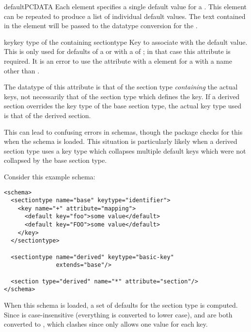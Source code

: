 \documentclass{howto}
\newcommand{\datatype}[1]{\strong{#1}}
\begin{document}
\begin{elementdesc}{default}{PCDATA}
  Each  element specifies a single default value for
  a .  This element can be repeated to produce a
  list of individual default values.  The text contained in the
  element will be passed to the datatype conversion for the
  .

  \begin{attributedesc}{key}{key type of the containing sectiontype}
    Key to associate with the default value.  This is only used for
    defaults of a  or  with a
     of \code{+}; in that case this attribute is
    required.  It is an error to use the  attribute
    with a  element for a  with a
    name other than \code{+}.

    \begin{notice}[warning]
      The datatype of this attribute is that of the section type
      \emph{containing} the actual keys, not necessarily that of the
      section type which defines the key.  If a derived section
      overrides the key type of the base section type, the actual
      key type used is that of the derived section.

      This can lead to confusing errors in schemas, though the
       package checks for this when the schema is
      loaded.  This situation is particularly likely when a derived
      section type uses a key type which collapses multiple default
      keys which were not collapsed by the base section type.

      Consider this example schema:

\begin{verbatim}
<schema>
  <sectiontype name="base" keytype="identifier">
    <key name="+" attribute="mapping">
      <default key="foo">some value</default>
      <default key="FOO">some value</default>
    </key>
  </sectiontype>

  <sectiontype name="derived" keytype="basic-key"
               extends="base"/>

  <section type="derived" name="*" attribute="section"/>
</schema>
\end{verbatim}

      When this schema is loaded, a set of defaults for the
      \datatype{derived} section type is computed.  Since
      \datatype{basic-key} is case-insensitive (everything is
      converted to lower case),  and  are both
      converted to , which clashes since  only
      allows one value for each key.
    \end{notice}
  \end{attributedesc}
\end{elementdesc}
\end{document}
